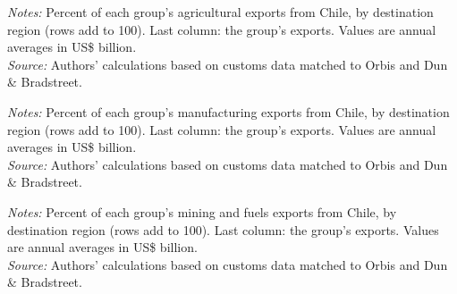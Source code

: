 \documentclass[11pt,a4paper]{article}
\begin{document}
\begin{table}[H]\centering\small%
  \caption{Chile, Agriculture: Multinational Exports by Parent Region and Destination Region}%
  \label{tab:c_reg_CHL_agro}%
  \par\vspace{3pt}%
  \begin{minipage}{0.95\textwidth}\footnotesize %
  \textit{Notes:} Percent of each group's agricultural exports from Chile, by destination region (rows add to 100). Last column: the group's exports. Values are annual averages in US\$ billion.\\[3pt]%
  \textit{Source:} Authors' calculations based on customs data matched to Orbis and Dun \& Bradstreet.%
  \end{minipage}%
  \end{table}
\begin{table}[H]\centering\small%
  \caption{Chile, Manufacturing: Multinational Exports by Parent Region and Destination Region}%
  \label{tab:c_reg_CHL_manufacturing}%
  \par\vspace{3pt}%
  \begin{minipage}{0.95\textwidth}\footnotesize %
  \textit{Notes:} Percent of each group's manufacturing exports from Chile, by destination region (rows add to 100). Last column: the group's exports. Values are annual averages in US\$ billion.\\[3pt]%
  \textit{Source:} Authors' calculations based on customs data matched to Orbis and Dun \& Bradstreet.%
  \end{minipage}%
  \end{table}
\begin{table}[H]\centering\small%
  \caption{Chile, Mining and Fuels: Multinational Exports by Parent Region and Destination Region}%
  \label{tab:c_reg_CHL_mining}%
  \par\vspace{3pt}%
  \begin{minipage}{0.95\textwidth}\footnotesize %
  \textit{Notes:} Percent of each group's mining and fuels exports from Chile, by destination region (rows add to 100). Last column: the group's exports. Values are annual averages in US\$ billion.\\[3pt]%
  \textit{Source:} Authors' calculations based on customs data matched to Orbis and Dun \& Bradstreet.%
  \end{minipage}%
  \end{table}
\end{document}
